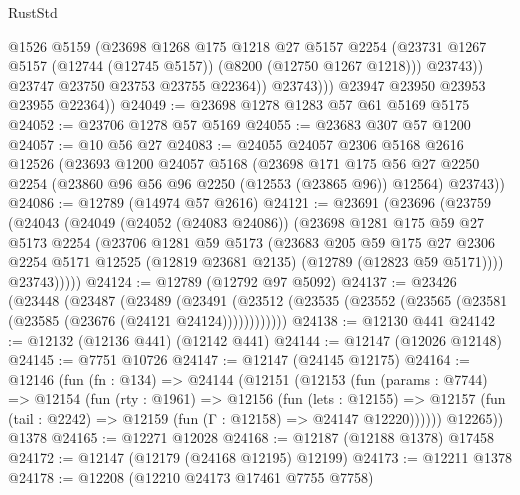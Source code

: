 \begin{lexlean}{RustStd}
\begin{coremodule}
                    @1526
                    @5159
                    (@23698
                      @1268
                      @175
                      @1218
                      @27
                      @5157
                      @2254
                      (@23731 @1267 @5157 (@12744 (@12745 @5157)) (@8200 (@12750 @1267 @1218)))
                      @23743))
                  @23747
                  @23750
                  @23753
                  @23755
                  @22364))
              @23743)))
        @23947
        @23950
        @23953
        @23955
        @22364))
@24049 := @23698 @1278 @1283 @57 @61 @5169 @5175
@24052 := @23706 @1278 @57 @5169
@24055 := @23683 @307 @57 @1200
@24057 := @10 @56 @27
@24083 := @24055
    @24057
    @2306
    @5168
    @2616
    @12526
    (@23693
      @1200
      @24057
      @5168
      (@23698
        @171
        @175
        @56
        @27
        @2250
        @2254
        (@23860 @96 @56 @96 @2250 (@12553 (@23865 @96)) @12564)
        @23743))
@24086 := @12789 (@14974 @57 @2616)
@24121 := @23691
    (@23696
      (@23759
        (@24043
          (@24049
            (@24052 (@24083 @24086))
            (@23698
              @1281
              @175
              @59
              @27
              @5173
              @2254
              (@23706
                @1281
                @59
                @5173
                (@23683
                  @205
                  @59
                  @175
                  @27
                  @2306
                  @2254
                  @5171
                  @12525
                  (@12819 @23681 @2135)
                  (@12789 (@12823 @59 @5171))))
              @23743)))))
@24124 := @12789 (@12792 @97 @5092)
@24137 := @23426
    (@23448
      (@23487
        (@23489
          (@23491 (@23512 (@23535 (@23552 (@23565 (@23581 (@23585 (@23676 (@24121 @24124))))))))))))
@24138 := @12130 @441
@24142 := @12132 (@12136 @441) (@12142 @441)
@24144 := @12147 (@12026 @12148)
@24145 := @7751 @10726
@24147 := @12147 (@24145 @12175)
@24164 := @12146
    (fun (fn : @134) =>
    @24144
      (@12151
        (@12153
          (fun (params : @7744) =>
          @12154
            (fun (rty : @1961) =>
            @12156
              (fun (lets : @12155) =>
              @12157 (fun (tail : @2242) => @12159 (fun (Γ : @12158) => @24147 @12220))))))
        @12265))
    @1378
@24165 := @12271 @12028
@24168 := @12187 (@12188 @1378) @17458
@24172 := @12147 (@12179 (@24168 @12195) @12199)
@24173 := @12211 @1378
@24178 := @12208 (@12210 @24173 @17461 @7755 @7758)

\end{coremodule}
\end{lexlean}
